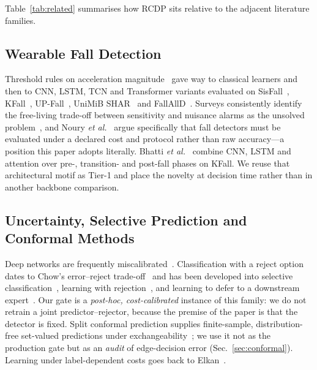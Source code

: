 \documentclass[journal]{IEEEtran}
\begin{document}
Table~\ref{tab:related} summarises how RCDP sits relative to the adjacent literature families.



\subsection{Wearable Fall Detection}
Threshold rules on acceleration magnitude~\cite{bourke2007threshold,nurek2020fallsurvey} gave way to classical learners and then to CNN, LSTM, TCN and Transformer variants evaluated on SisFall~\cite{sisfall2017}, KFall~\cite{kfall2021}, UP-Fall~\cite{martinez2019upfall}, UniMiB SHAR~\cite{micucci2017unimib} and FallAllD~\cite{saleh2021fallalld}. Surveys consistently identify the free-living trade-off between sensitivity and nuisance alarms as the unsolved problem~\cite{iglesias2019wearable,khan2017review,ren2021survey,mubashir2013survey}, and Noury \textit{et al.}~\cite{noury2008evaluation} argue specifically that fall detectors must be evaluated under a declared cost and protocol rather than raw accuracy---a position this paper adopts literally. Bhatti \textit{et al.}~\cite{bhatti2025beyond} combine CNN, LSTM and attention over pre-, transition- and post-fall phases on KFall. We reuse that architectural motif as Tier-1 and place the novelty at decision time rather than in another backbone comparison.

\subsection{Uncertainty, Selective Prediction and Conformal Methods}
Deep networks are frequently miscalibrated~\cite{guo2017calibration,platt1999probabilistic,lakshminarayanan2017ensembles}. Classification with a reject option dates to Chow's error--reject trade-off~\cite{chow1970reject} and has been developed into selective classification~\cite{el2010foundations,geifman2017selective}, learning with rejection~\cite{cortes2016rejection}, and learning to defer to a downstream expert~\cite{madras2018defer,mozannar2020defer}. Our gate is a \emph{post-hoc, cost-calibrated} instance of this family: we do not retrain a joint predictor--rejector, because the premise of the paper is that the detector is fixed. Split conformal prediction supplies finite-sample, distribution-free set-valued predictions under exchangeability~\cite{vovk2005algorithmic,shafer2008tutorial,angelopoulos2023gentle,romano2019conformalized}; we use it not as the production gate but as an \emph{audit} of edge-decision error (Sec.~\ref{sec:conformal}). Learning under label-dependent costs goes back to Elkan~\cite{elkan2001foundations}.
\end{document}
